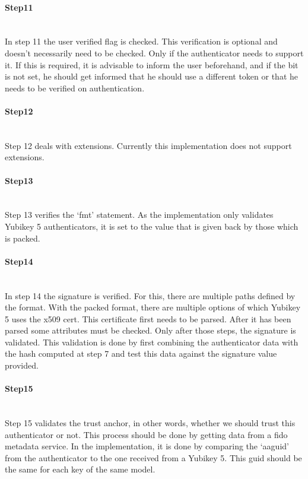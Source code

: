 \documentclass[a4paper, 11pt]{scrartcl}
\begin{document}
\paragraph{Step11}\hfill \\ 
In step 11 the user verified flag is checked. This verification is optional and doesn't necessarily need to be checked. Only if the authenticator needs to support it. If this is required, it is advisable to inform the user beforehand, and if the bit is not set, he should get informed that he should use a different token or that he needs to be verified on authentication.

\paragraph{Step12}\hfill \\ 
Step 12 deals with extensions. Currently this implementation does not support extensions.

\paragraph{Step13}\hfill \\ 
Step 13 verifies the `fmt' statement. As the implementation only validates Yubikey 5 authenticators, it is set to the value that is given back by those which is packed.

\paragraph{Step14}\hfill \\ 
In step 14 the signature is verified. For this, there are multiple paths defined by the format. With the packed format, there are multiple options of which Yubikey 5 uses the x509 cert. This certificate first needs to be parsed. After it has been parsed some attributes must be checked. Only after those steps, the signature is validated. This validation is done by first combining the authenticator data with the hash computed at step 7 and test this data against the signature value provided.

\paragraph{Step15}\hfill \\ 
Step 15 validates the trust anchor, in other words, whether we should trust this authenticator or not. This process should be done by getting data from a \gls{fido} metadata service. In the implementation, it is done by comparing the `aaguid' from the authenticator to the one received from a Yubikey 5. This guid should be the same for each key of the same model.
\end{document}
